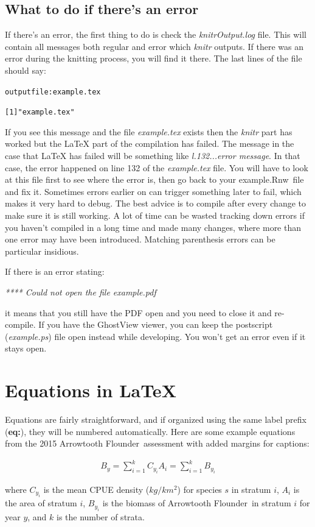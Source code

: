 \documentclass[11pt]{book}\usepackage[]{graphicx}\usepackage[]{color}
\newcommand{\texfile}{example.tex}
\newcommand{\rnwexamplefile}{example.Rnw}
\newcommand{\latex}{\LaTeX\xspace}
\newcommand{\fishname}{Arrowtooth Flounder}
\begin{document}
\subsection{What to do if there's an error}

If there's an error, the first thing to do is check the \emph{knitrOutput.log} file. This will contain all messages both regular and error which \emph{knitr} outputs. If there was an error during the knitting process, you will find it there. The last lines of the file should say:
\begin{alltt}
  output file: \texfile

  [1] "\texfile"
\end{alltt}
If you see this message and the file \emph{\texfile} exists then the \emph{knitr} part has worked but the \latex part of the compilation has failed. The message in the case that \latex has failed will be something like \emph{l.132...error message}. In that case, the error happened on line 132 of the \emph{\texfile} file. You will have to look at this file first to see where the error is, then go back to your \rnwexamplefile\ file and fix it. Sometimes errors earlier on can trigger something later to fail, which makes it very hard to debug. The best advice is to compile after every change to make sure it is still working. A lot of time can be wasted tracking down errors if you haven't compiled in a long time and made many changes, where more than one error may have been introduced. Matching parenthesis errors can be particular insidious.

If there is an error stating:

\emph{**** Could not open the file example.pdf}

it means that you still have the PDF open and you need to close it and re-compile. If you have the GhostView viewer, you can keep the postscript (\emph{example.ps}) file open instead while developing. You won't get an error even if it stays open.

\bigskip

\section{Equations in \latex}
Equations are fairly straightforward, and if organized using the same label prefix (\textbf{eq:}), they will be numbered automatically. Here are some example equations from the 2015 \fishname\ assessment with added margins for captions:

\begin{align} \label{eq:sweptareaindex}
B_y = \sum_{i=1}^kC_{y_i}A_i=\sum_{i=1}^kB_{y_i}
\end{align}
\begin{addmargin}[3em]{1em}
where $C_{y_i}$ is the mean CPUE density ($kg/km^2$) for species $s$ in stratum $i$, $A_i$ is the area of stratum $i$, $B_{y_i}$ is the biomass of \fishname\ in stratum $i$ for year $y$, and $k$ is the number of strata.
\end{addmargin}
\end{document}
